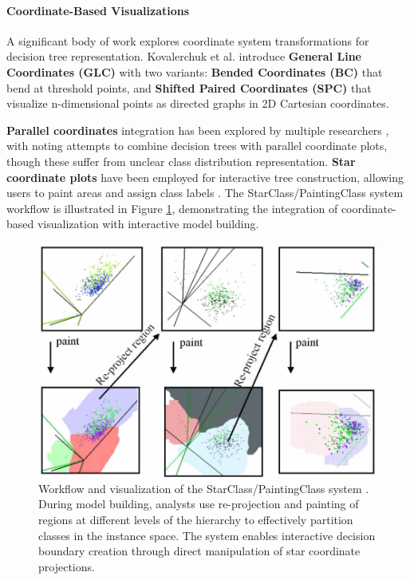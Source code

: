 \paragraph{Coordinate-Based Visualizations}

A significant body of work explores coordinate system transformations for decision tree representation. Kovalerchuk et al. \cite{kovalerchuk2019interactive} introduce \textbf{General Line Coordinates (GLC)} with two variants: \textbf{Bended Coordinates (BC)} that bend at threshold points, and \textbf{Shifted Paired Coordinates (SPC)} that visualize n-dimensional points as directed graphs in 2D Cartesian coordinates.

\textbf{Parallel coordinates} integration has been explored by multiple researchers \cite{elzen2011baobabview, 10.1007/978-3-540-74205-0_121}, with noting attempts to combine decision trees with parallel coordinate plots, though these suffer from unclear class distribution representation. \textbf{Star coordinate plots} have been employed for interactive tree construction, allowing users to paint areas and assign class labels \cite{elzen2011baobabview, 10.1145/956750.956837, Teoh2003StarClassIV}. The StarClass/PaintingClass system workflow is illustrated in Figure \ref{fig:starclass_workflow}, demonstrating the integration of coordinate-based visualization with interactive model building.

\begin{figure}[!htb]
    \centering
    \includegraphics[width=0.9\linewidth]{images/starclass1.png}
    \caption{Workflow and visualization of the StarClass/PaintingClass system \cite{10.1007/978-3-540-74205-0_121, 10.1145/956750.956837}. During model building, analysts use re-projection and painting of regions at different levels of the hierarchy to effectively partition classes in the instance space. The system enables interactive decision boundary creation through direct manipulation of star coordinate projections.}
    \label{fig:starclass_workflow}
\end{figure}

